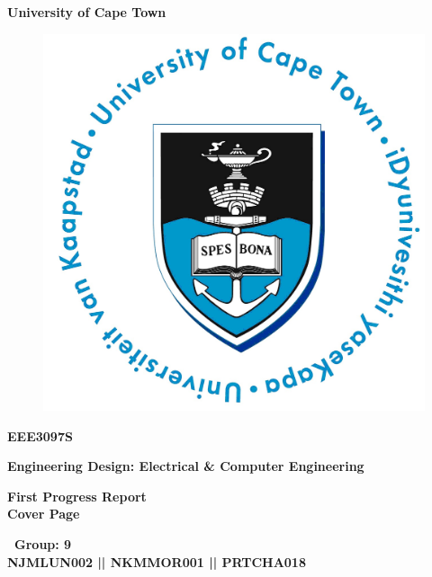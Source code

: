 \documentclass[a4paper,11pt]{article}
\begin{document}

\begin{titlepage}
	
	\thispagestyle{empty}
	\centering 
	{\Large\bfseries University of Cape Town}
	
	\begin{figure}[ht!]
		\centering
		{\includegraphics[scale=0.25]{UCT_Logo.jpg}}
		\label{Schematic:1}
	\end{figure}
	
	\vspace{0.809cm}
	
	{\Large\bfseries EEE3097S}
	
	\vspace{0.809cm}
	
	{\Large\bfseries Engineering Design: Electrical \& Computer Engineering}
	
	\vspace{4.472cm}
	
	{\LARGE\bfseries First Progress Report\\Cover Page}
	
	\vspace{1.00cm}
	
	
	\vspace{5.008cm}
	
	{\large\bfseries ~Group: 9\\ NJMLUN002 || NKMMOR001 || PRTCHA018}
	

\end{titlepage}
\end{document}
